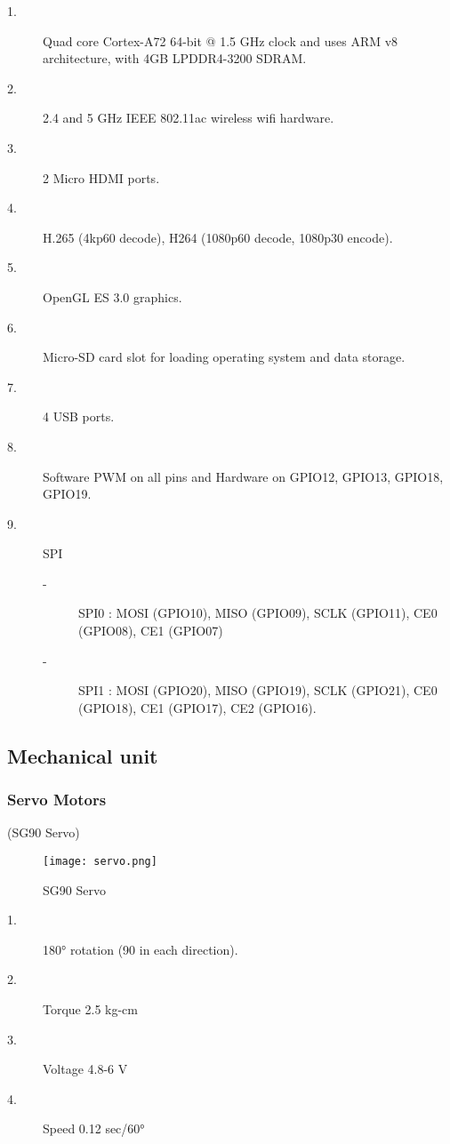\documentclass[../../../patent_v1.tex]{subfiles}
\begin{document}
\begin{description}
    \item[1.]Quad core Cortex-A72 64-bit @ 1.5 GHz clock and uses ARM v8 architecture, 
    with 4GB LPDDR4-3200 SDRAM.
    \item[2.]2.4 and 5 GHz IEEE 802.11ac wireless wifi hardware.
    \item[3.]2 Micro HDMI ports.
    \item[4.]H.265 (4kp60 decode), H264 (1080p60 decode, 1080p30 encode).
    \item[5.]OpenGL ES 3.0 graphics.
    \item[6.]Micro-SD card slot for loading operating system and data storage.
    \item[7.]4 USB ports.
    \item[8.]Software PWM on all pins and Hardware on GPIO12, GPIO13, GPIO18, GPIO19.
    \item[9.]SPI
    \begin{description}
        \item[-]SPI0 : MOSI (GPIO10), MISO (GPIO09), SCLK (GPIO11), CE0 (GPIO08), CE1 (GPIO07)
        \item[-]SPI1 : MOSI (GPIO20), MISO (GPIO19), SCLK (GPIO21), CE0 (GPIO18), CE1 (GPIO17), CE2 (GPIO16).  
    \end{description}  
\end{description}

\subsection{Mechanical unit}

\subsubsection{Servo Motors}

(SG90 Servo)

\begin{figure}[ht]
    \centering
    \texttt{[image: servo.png]}
    \caption{SG90 Servo}
\end{figure}

\FloatBarrier

\begin{description}
    \item[1.]180\si{\degree} rotation (90 in each direction).
    \item[2.]Torque 2.5 kg-cm
    \item[3.]Voltage 4.8-6 V  
    \item[4.]Speed 0.12 sec/60\si{\degree}
\end{description}
\end{document}
